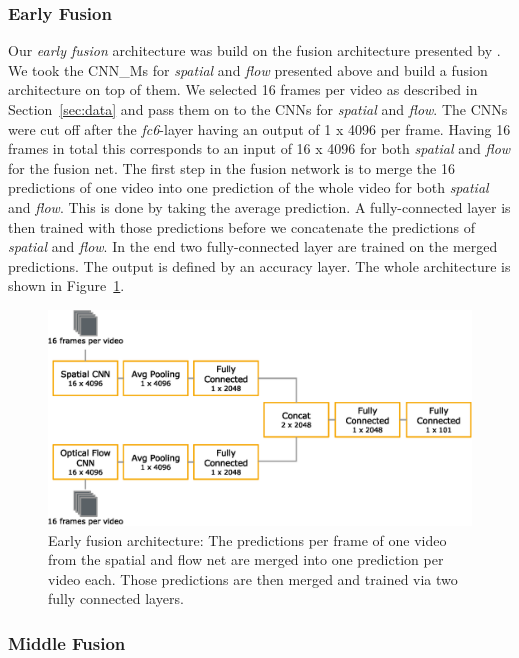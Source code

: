\subsubsection{Early Fusion}
Our \emph{early fusion} architecture was build on the fusion architecture presented by .
We took the CNN\_Ms for \emph{spatial} and \emph{flow} presented above and build a fusion architecture on top of them.
We selected 16 frames per video as described in Section~\ref{sec:data} and pass them on to the CNNs for \emph{spatial} and \emph{flow}.
The CNNs were cut off after the \textit{fc6}-layer having an output of 1 x 4096 per frame.
Having 16 frames in total this corresponds to an input of 16 x 4096 for both \emph{spatial} and \emph{flow} for the fusion net.
The first step in the fusion network is to merge the 16 predictions of one video into one prediction of the whole video for both \emph{spatial} and \emph{flow}.
This is done by taking the average prediction.
A fully-connected layer is then trained with those predictions before we concatenate the predictions of \emph{spatial} and \emph{flow}.
In the end two fully-connected layer are trained on the merged predictions.
The output is defined by an accuracy layer.
The whole architecture is shown in Figure~\ref{fig:early_fusion}.
\begin{figure}[!htb]
	\centering
	\includegraphics[scale=.7]{images/early_fusion.eps}
	\caption{Early fusion architecture: The predictions per frame of one video from the spatial and flow net are merged into one prediction per video each. Those predictions are then merged and trained via two fully connected layers.}
	\label{fig:early_fusion}
\end{figure}


\subsubsection{Middle Fusion}


